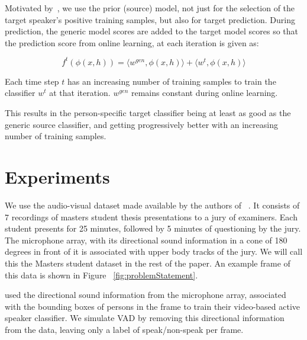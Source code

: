 \documentclass[runningheads]{llncs}
\begin{document}
Motivated by~\cite{Gavves15}, we use the prior (source) model, not just for the selection of the target speaker's positive training samples, but also for target prediction.
%
During prediction, the generic model scores are added to the target model scores 
so that the prediction score from online learning, at each iteration is given as:

\begin{dmath}
f^{t}(\phi(x,h))=\langle w^{gen}, \phi(x,h) \rangle + \langle w^{t}, \phi(x,h) \rangle
\label{eq:predictionScore}
\end{dmath}

Each time step $t$ has an increasing number of training samples to train the classifier $w^{t}$ at that iteration. $ w^{gen}$ remains constant during online learning.

This results in the person-specific target classifier being at least as good as the generic source classifier, and getting progressively better with an increasing number of training samples.






\section{Experiments}
\label{expts}

We use the audio-visual dataset made available by the authors of ~\cite{Chakravarty15}. It consists of 7 recordings of masters student thesis presentations to a jury of examiners. Each student presents for 25 minutes, followed by 5 minutes of questioning by the jury. The microphone array, with its directional sound information in a cone of 180 degrees in front of it is associated with upper body tracks of the jury. We will call this the Masters student dataset in the rest of the paper. An example frame of this data is shown in Figure ~\ref{fig:problemStatement}.

\cite{Chakravarty15} used the directional sound information from the microphone array, associated with the bounding boxes of persons in the frame to train their video-based active speaker classifier. We simulate VAD by removing this directional information from the data, leaving only a label of speak/non-speak per frame.
\end{document}
